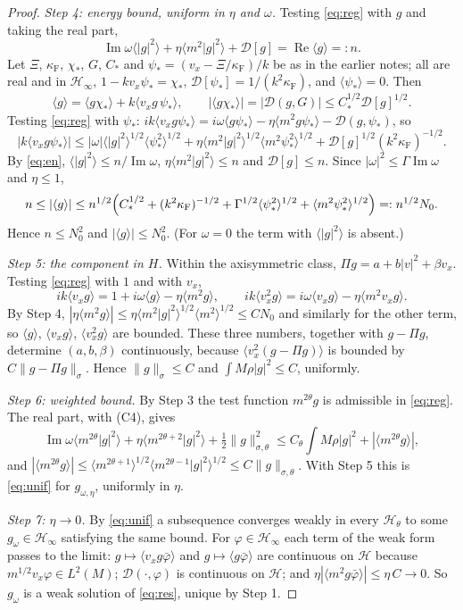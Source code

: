 \documentclass[11pt]{article}
\newcommand{\cD}{\mathcal{D}}
\newcommand{\cH}{\mathcal{H}}
\newcommand{\avg}[1]{\langle #1\rangle}
\renewcommand{\Re}{\operatorname{Re}}
\renewcommand{\Im}{\operatorname{Im}}
\theoremstyle{remark}
\begin{document}
\begin{proof}
\emph{Step 4: energy bound, uniform in $\eta$ and $\omega$.} Testing
\eqref{eq:reg} with $g$ and taking the real part,
\begin{equation}
  \Im\omega\avg{|g|^2}+\eta\avg{m^2|g|^2}+\cD[g]=\Re\avg{g}=:n .
  \label{eq:en}
\end{equation}
Let $\Xi$, $\kappa_{\mathrm F}$, $\chi_*$, $G$, $C_*$ and
$\psi_*=(v_x-\Xi/\kappa_{\mathrm F})/k$ be as in the earlier notes; all are
real and in $\cH_\infty$, $1-kv_x\psi_*=\chi_*$,
$\cD[\psi_*]=1/(k^2\kappa_{\mathrm F})$, and $\avg{\psi_*}=0$. Then
\[
  \avg{g}=\avg{g\chi_*}+k\avg{v_xg\,\psi_*},\qquad
  |\avg{g\chi_*}|=|\cD(g,G)|\le C_*^{1/2}\cD[g]^{1/2}.
\]
Testing \eqref{eq:reg} with $\psi_*$:
$ik\avg{v_xg\psi_*}=i\omega\avg{g\psi_*}-\eta\avg{m^2g\psi_*}-\cD(g,\psi_*)$,
so
\[
  |k\avg{v_xg\psi_*}|\le|\omega|\avg{|g|^2}^{1/2}\avg{\psi_*^2}^{1/2}
  +\eta\avg{m^2|g|^2}^{1/2}\avg{m^2\psi_*^2}^{1/2}
  +\cD[g]^{1/2}(k^2\kappa_{\mathrm F})^{-1/2}.
\]
By \eqref{eq:en}, $\avg{|g|^2}\le n/\Im\omega$,
$\eta\avg{m^2|g|^2}\le n$ and $\cD[g]\le n$. Since
$|\omega|^2\le\Gamma\Im\omega$ and $\eta\le1$,
\[
  n\le|\avg{g}|\le n^{1/2}\Bigl(C_*^{1/2}+(k^2\kappa_{\mathrm F})^{-1/2}
  +\Gamma^{1/2}\avg{\psi_*^2}^{1/2}+\avg{m^2\psi_*^2}^{1/2}\Bigr)
  =:n^{1/2}N_0 .
\]
Hence $n\le N_0^2$ and $|\avg{g}|\le N_0^2$. (For $\omega=0$ the term with
$\avg{|g|^2}$ is absent.)

\emph{Step 5: the component in $H$.} Within the axisymmetric class,
$\Pi g=a+b|v|^2+\beta v_x$. Testing \eqref{eq:reg} with $1$ and with $v_x$,
\[
  ik\avg{v_xg}=1+i\omega\avg{g}-\eta\avg{m^2g},\qquad
  ik\avg{v_x^2g}=i\omega\avg{v_xg}-\eta\avg{m^2v_xg}.
\]
By Step 4, $|\eta\avg{m^2g}|\le\eta\avg{m^2|g|^2}^{1/2}\avg{m^2}^{1/2}\le CN_0$
and similarly for the other term, so $\avg{g}$, $\avg{v_xg}$, $\avg{v_x^2g}$
are bounded. These three numbers, together with $g-\Pi g$, determine
$(a,b,\beta)$ continuously, because $\avg{v_x^2(g-\Pi g)}$ is bounded by
$C\|g-\Pi g\|_\sigma$. Hence $\|g\|_\sigma\le C$ and
$\int M\rho|g|^2\le C$, uniformly.

\emph{Step 6: weighted bound.} By Step 3 the test function $m^{2\theta}g$ is
admissible in \eqref{eq:reg}. The real part, with (C4), gives
\[
  \Im\omega\avg{m^{2\theta}|g|^2}+\eta\avg{m^{2\theta+2}|g|^2}
  +\tfrac12\|g\|^2_{\sigma,\theta}
  \le C_\theta\int M\rho|g|^2+|\avg{m^{2\theta}g}|,
\]
and $|\avg{m^{2\theta}g}|\le\avg{m^{2\theta+1}}^{1/2}\avg{m^{2\theta-1}|g|^2}^{1/2}
\le C\|g\|_{\sigma,\theta}$. With Step 5 this is \eqref{eq:unif} for
$g_{\omega,\eta}$, uniformly in $\eta$.

\emph{Step 7: $\eta\to0$.} By \eqref{eq:unif} a subsequence converges weakly
in every $\cH_\theta$ to some $g_\omega\in\cH_\infty$ satisfying the same
bound. For $\varphi\in\cH_\infty$ each term of the weak form passes to the
limit: $g\mapsto\avg{v_xg\bar\varphi}$ and $g\mapsto\avg{g\bar\varphi}$ are
continuous on $\cH$ because $m^{1/2}v_x\varphi\in L^2(M)$; $\cD(\cdot,\varphi)$
is continuous on $\cH$; and
$\eta|\avg{m^2g\bar\varphi}|\le\eta\,C\to0$. So $g_\omega$ is a weak solution
of \eqref{eq:res}, unique by Step 1.
\end{proof}
\end{document}
